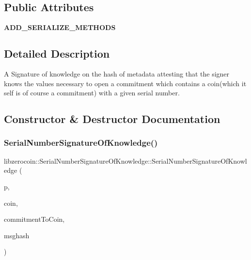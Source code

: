 \subsection*{Public Attributes}
\begin{DoxyCompactItemize}
\item 
\mbox{\label{classlibzerocoin_1_1_serial_number_signature_of_knowledge_a3ff30dcb83e75058b66e84cf1f9c671a}} 
{\bfseries A\+D\+D\+\_\+\+S\+E\+R\+I\+A\+L\+I\+Z\+E\+\_\+\+M\+E\+T\+H\+O\+DS}
\end{DoxyCompactItemize}


\subsection{Detailed Description}
A Signature of knowledge on the hash of metadata attesting that the signer knows the values necessary to open a commitment which contains a coin(which it self is of course a commitment) with a given serial number. 

\subsection{Constructor \& Destructor Documentation}
\mbox{\label{classlibzerocoin_1_1_serial_number_signature_of_knowledge_adb04da379098298cad6e05c930d6483f}} 
\subsubsection{\texorpdfstring{Serial\+Number\+Signature\+Of\+Knowledge()}{SerialNumberSignatureOfKnowledge()}}
{\footnotesize\ttfamily libzerocoin\+::\+Serial\+Number\+Signature\+Of\+Knowledge\+::\+Serial\+Number\+Signature\+Of\+Knowledge (\begin{DoxyParamCaption}\item[{const \mbox{\hyperlink{classlibzerocoin_1_1_zerocoin_params}{Zerocoin\+Params}} $\ast$}]{p,  }\item[{const \mbox{\hyperlink{classlibzerocoin_1_1_private_coin}{Private\+Coin}} \&}]{coin,  }\item[{const \mbox{\hyperlink{classlibzerocoin_1_1_commitment}{Commitment}} \&}]{commitment\+To\+Coin,  }\item[{\mbox{\hyperlink{classuint256}{uint256}}}]{msghash }\end{DoxyParamCaption})}

